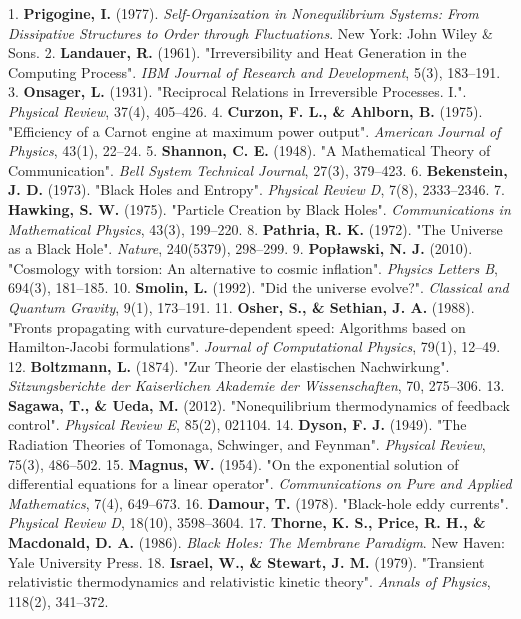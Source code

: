 \documentclass[11pt,a4paper]{article}
\theoremstyle{definition}\newtheorem{definition}{Definition}
\theoremstyle{remark}\newtheorem{remark}{Remark}
\begin{document}
1. \textbf{Prigogine, I.} (1977). \textit{Self-Organization in Nonequilibrium Systems: From Dissipative Structures to Order through Fluctuations}. New York: John Wiley \& Sons.
2. \textbf{Landauer, R.} (1961). "Irreversibility and Heat Generation in the Computing Process". \textit{IBM Journal of Research and Development}, 5(3), 183–191.
3. \textbf{Onsager, L.} (1931). "Reciprocal Relations in Irreversible Processes. I.". \textit{Physical Review}, 37(4), 405–426.
4. \textbf{Curzon, F. L., \& Ahlborn, B.} (1975). "Efficiency of a Carnot engine at maximum power output". \textit{American Journal of Physics}, 43(1), 22–24.
5. \textbf{Shannon, C. E.} (1948). "A Mathematical Theory of Communication". \textit{Bell System Technical Journal}, 27(3), 379–423.
6. \textbf{Bekenstein, J. D.} (1973). "Black Holes and Entropy". \textit{Physical Review D}, 7(8), 2333–2346.
7. \textbf{Hawking, S. W.} (1975). "Particle Creation by Black Holes". \textit{Communications in Mathematical Physics}, 43(3), 199–220.
8. \textbf{Pathria, R. K.} (1972). "The Universe as a Black Hole". \textit{Nature}, 240(5379), 298–299.
9. \textbf{Popławski, N. J.} (2010). "Cosmology with torsion: An alternative to cosmic inflation". \textit{Physics Letters B}, 694(3), 181–185.
10. \textbf{Smolin, L.} (1992). "Did the universe evolve?". \textit{Classical and Quantum Gravity}, 9(1), 173–191.
11. \textbf{Osher, S., \& Sethian, J. A.} (1988). "Fronts propagating with curvature-dependent speed: Algorithms based on Hamilton-Jacobi formulations". \textit{Journal of Computational Physics}, 79(1), 12–49.
12. \textbf{Boltzmann, L.} (1874). "Zur Theorie der elastischen Nachwirkung". \textit{Sitzungsberichte der Kaiserlichen Akademie der Wissenschaften}, 70, 275–306.
13. \textbf{Sagawa, T., \& Ueda, M.} (2012). "Nonequilibrium thermodynamics of feedback control". \textit{Physical Review E}, 85(2), 021104.
14. \textbf{Dyson, F. J.} (1949). "The Radiation Theories of Tomonaga, Schwinger, and Feynman". \textit{Physical Review}, 75(3), 486–502.
15. \textbf{Magnus, W.} (1954). "On the exponential solution of differential equations for a linear operator". \textit{Communications on Pure and Applied Mathematics}, 7(4), 649–673.
16. \textbf{Damour, T.} (1978). "Black-hole eddy currents". \textit{Physical Review D}, 18(10), 3598–3604.
17. \textbf{Thorne, K. S., Price, R. H., \& Macdonald, D. A.} (1986). \textit{Black Holes: The Membrane Paradigm}. New Haven: Yale University Press.
18. \textbf{Israel, W., \& Stewart, J. M.} (1979). "Transient relativistic thermodynamics and relativistic kinetic theory". \textit{Annals of Physics}, 118(2), 341–372.
\end{document}
